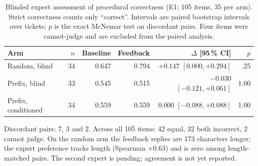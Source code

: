 \begin{table}[t]
\centering
\begin{threeparttable}
\caption{Blinded expert assessment of procedural correctness (E1; 105 items,
35 per arm). Strict correctness counts only ``correct''. Intervals are paired
bootstrap intervals over tickets; $p$ is the exact McNemar test on discordant
pairs. Four items were cannot-judge and are excluded from the paired analysis.}
\label{tab:human}
\begin{tabular}{@{}lrrrrr@{}}
\toprule
Arm & $n$ & Baseline & Feedback & $\Delta$ [95\,\% CI] & $p$ \\
\midrule
Random, blind       & 34 & 0.647 & 0.794 & $+0.147$ $[0.000, +0.294]$ & .25 \\
Prefix, blind       & 33 & 0.545 & 0.515 & $-0.030$ $[-0.121, +0.061]$ & 1.00 \\
Prefix, conditioned & 34 & 0.559 & 0.559 & $0.000$ $[-0.088, +0.088]$ & 1.00 \\
\bottomrule
\end{tabular}
\begin{tablenotes}[flushleft]
\footnotesize
\item Discordant pairs: 7, 3 and 2. Across all 105 items: 42 equal, 32 both
incorrect, 2 cannot judge. On the random arm the feedback replies are 173
characters longer; the expert preference tracks length (Spearman $+0.63$) and is
zero among length-matched pairs. The second expert is pending; agreement is not
yet reported.
\end{tablenotes}
\end{threeparttable}
\end{table}

